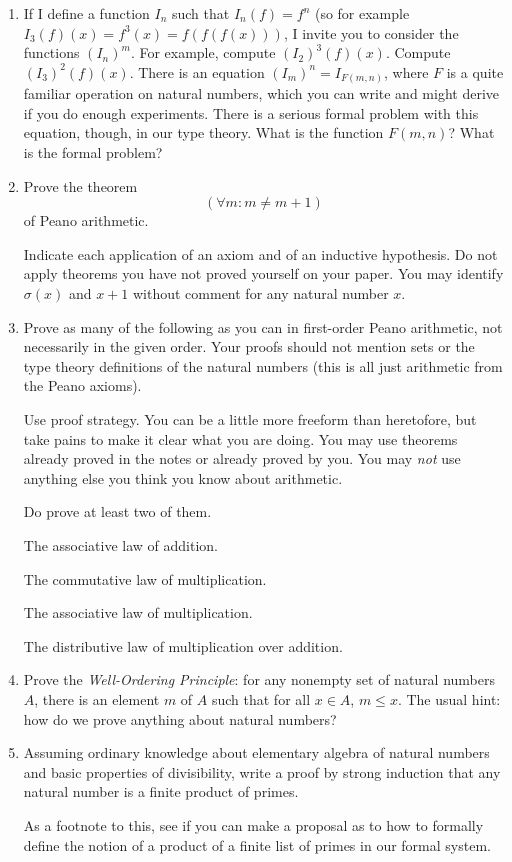 \documentclass[12pt]{book}
\begin{document}
\begin{enumerate}

\item
If I define a function $I_n$ such that $I_n(f) = f^n$ (so for example
$I_3(f)(x) = f^3(x) = f(f(f(x)))$, I invite you to consider the
functions $(I_n)^m$.  For example, compute $(I_2)^3(f)(x)$.  Compute
$(I_3)^2(f)(x)$.  There is an equation $(I_m)^n = I_{F(m,n)}$, where
$F$ is a quite familiar operation on natural numbers, which you can
write and might derive if you do enough experiments.  There is a
serious formal problem with this equation, though, in our type theory.
What is the function $F(m,n)$?  What is the formal problem?

\item Prove  the theorem $$(\forall m:m \neq m+1)$$ of Peano arithmetic.

Indicate each application of an axiom and of an inductive hypothesis.
Do not apply theorems you have not proved yourself on your paper.  You
may identify $\sigma(x)$ and $x+1$ without comment for any natural
number $x$.

\item
 Prove as many of the following as you can in first-order Peano
 arithmetic, not necessarily in the given order.  Your proofs should
 not mention sets or the type theory definitions of the natural
 numbers (this is all just arithmetic from the Peano axioms).

 Use proof strategy.  You can be a little more freeform than
 heretofore, but take pains to make it clear what you are doing.  You
 may use theorems already proved in the notes or already proved by
 you.  You may {\em not\/} use anything else you think you know about
 arithmetic.

Do prove at least two of them.

The associative law of addition.

The commutative law of multiplication.

The associative law of multiplication.

The distributive law of multiplication over addition.

\item  Prove the {\em Well-Ordering Principle\/}:  for any nonempty set of natural numbers $A$, there is an element $m$ of $A$ such that for all $x \in A$, $m \leq x$.  The usual hint:  how do we prove anything about natural numbers?

\item Assuming ordinary knowledge about elementary algebra of natural numbers and basic properties of divisibility, write a proof by strong induction that any natural number is a finite product of primes.

As a footnote to this, see if you can make a proposal as to how to formally define the notion of a product of a finite list of primes in our formal system.


\end{enumerate}
\end{document}
